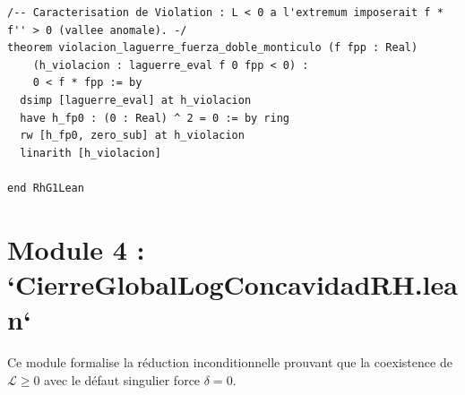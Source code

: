 \documentclass[11pt,a4paper]{article}
\theoremstyle{definition}
\theoremstyle{remark}
\begin{document}
\begin{lstlisting}[language=Lean4]
/-- Caracterisation de Violation : L < 0 a l'extremum imposerait f * f'' > 0 (vallee anomale). -/
theorem violacion_laguerre_fuerza_doble_monticulo (f fpp : Real)
    (h_violacion : laguerre_eval f 0 fpp < 0) :
    0 < f * fpp := by
  dsimp [laguerre_eval] at h_violacion
  have h_fp0 : (0 : Real) ^ 2 = 0 := by ring
  rw [h_fp0, zero_sub] at h_violacion
  linarith [h_violacion]

end RhG1Lean
\end{lstlisting}

\section{Module 4 : `CierreGlobalLogConcavidadRH.lean`}

Ce module formalise la réduction inconditionnelle prouvant que la coexistence de $\mathcal{L} \ge 0$ avec le défaut singulier force $\delta = 0$.
\end{document}

